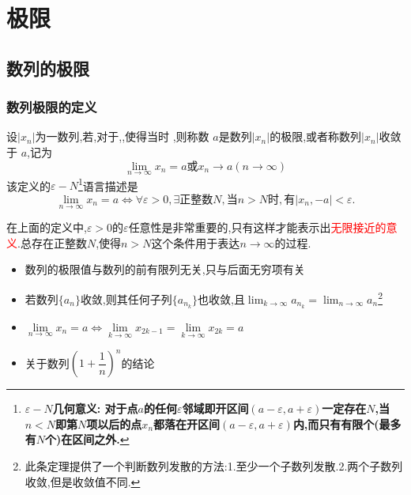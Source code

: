 \documentclass[12pt, a4paper, oneside, UTF8]{ctexbook}
\begin{document}
\begin{sloppypar}
    \else
    \fi
    \chapter{极限}
    \section{数列的极限}
    \subsection{数列极限的定义}
    \begin{defn}{}{}
        设$|x_n|$为一数列,若,对于,,使得当时 ,则称数 $a$是数列$| x_n |$的极限,或者称数列$| x_n |$收敛于 $a$,记为
        $$
            \lim_{n\to\infty}x_n=a\text{或}x_n\to a(n\to\infty)
        $$
        该定义的$\varepsilon-N$\footnote{$\varepsilon - N$\textbf{几何意义: 对于点$a$的任何$\varepsilon$邻域即开区间$(a-\varepsilon,a+\varepsilon)$一定存在$N$,当$n < N$即第$N$项以后的点$x_n$都落在开区间$(a-\varepsilon,a+\varepsilon)$内,而只有有限个(最多有$N$个)在区间之外.}}语言描述是
        \newline
        $$\lim_{n\to\infty}x_n=a\Leftrightarrow\forall\varepsilon>0,\exists\text{正整数}N,\text{当}n>N\text{时},\text{有}|x_n,-a|<\varepsilon.$$
    \end{defn}
    在上面的定义中,$\varepsilon>0$的$\varepsilon$任意性是非常重要的,只有这样才能表示出\textcolor{red}{无限接近的意义}.总存在正整数$N$,使得$n>N$这个条件用于表达$n \to \infty$的过程.
    \begin{criterion}{}{}
        \begin{itemize}
            \item 数列的极限值与数列的前有限列无关,只与后面无穷项有关
            \item 若数列$\{a_n\}$收敛,则其任何子列$\{a_{n_k}\}$也收敛,且$\lim_{k\to\infty}a_{n_k}=\lim_{n\to\infty}a_n$\footnote{ 此条定理提供了一个判断数列发散的方法:1.至少一个子数列发散.2.两个子数列收敛,但是收敛值不同.}
            \item $\underset{n\to\infty}{\operatorname*{\lim}}x_n=a\Leftrightarrow\underset{k\to\infty}{\operatorname*{\lim}}x_{2k-1}=\underset{k\to\infty}{\operatorname*{\lim}}x_{2k}=a$
            \item 关于数列$(1+\dfrac{1}{n})^n$的结论

\end{itemize}
\end{criterion}
\end{sloppypar}
\end{document}
